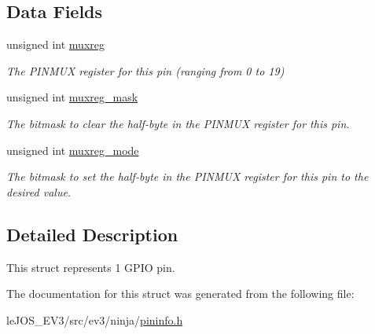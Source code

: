 \subsection*{Data Fields}
\begin{DoxyCompactItemize}
\item 
\hypertarget{structpin__info_af2f905eebe6fc994de7da4bac4768eee}{}unsigned int \hyperlink{structpin__info_af2f905eebe6fc994de7da4bac4768eee}{muxreg}\label{structpin__info_af2f905eebe6fc994de7da4bac4768eee}

\begin{DoxyCompactList}\small\item\em The P\+I\+N\+M\+U\+X register for this pin (ranging from 0 to 19) \end{DoxyCompactList}\item 
\hypertarget{structpin__info_a395f3bb9231a420a2a63ce320aee8c98}{}unsigned int \hyperlink{structpin__info_a395f3bb9231a420a2a63ce320aee8c98}{muxreg\+\_\+mask}\label{structpin__info_a395f3bb9231a420a2a63ce320aee8c98}

\begin{DoxyCompactList}\small\item\em The bitmask to clear the half-\/byte in the P\+I\+N\+M\+U\+X register for this pin. \end{DoxyCompactList}\item 
\hypertarget{structpin__info_a27e604e3021a936ff771536a6e5a72e1}{}unsigned int \hyperlink{structpin__info_a27e604e3021a936ff771536a6e5a72e1}{muxreg\+\_\+mode}\label{structpin__info_a27e604e3021a936ff771536a6e5a72e1}

\begin{DoxyCompactList}\small\item\em The bitmask to set the half-\/byte in the P\+I\+N\+M\+U\+X register for this pin to the desired value. \end{DoxyCompactList}\end{DoxyCompactItemize}


\subsection{Detailed Description}
This struct represents 1 G\+P\+I\+O pin. 

The documentation for this struct was generated from the following file\+:\begin{DoxyCompactItemize}
\item 
le\+J\+O\+S\+\_\+\+E\+V3/src/ev3/ninja/\hyperlink{pininfo_8h}{pininfo.\+h}\end{DoxyCompactItemize}
